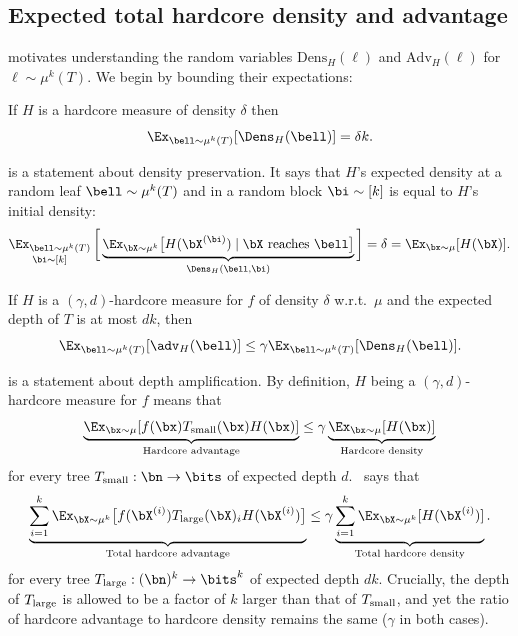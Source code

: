 \subsection{Expected total hardcore density and advantage}


 motivates understanding the random variables $\mathrm{Dens}_H(\boldsymbol{\ell})$ and $\mathrm{Adv}_H(\boldsymbol{\ell})$ for $\boldsymbol{\ell}\sim \mu^k(T)$. We begin by bounding their expectations:


\begin{claim}
\label{claim:expected total hardcore density} If $H$ is a hardcore measure of density $\delta$ then 
\[  \Ex_{\bell\sim \mu^k(T)}[\Dens_H(\bell)] = \delta k. \] 
\end{claim}


 is a statement about density preservation. It says that $H$'s expected density at a random leaf $\bell \sim \mu^k(T)$ and in a random block $\bi\sim [k]$ is equal to $H$'s initial density: 
\[  \mathop{\Ex_{\bell\sim \mu^k(T)}}_{\bi\sim [k]}\bigg[  \underbrace{\Ex_{\bX\sim \mu^k}\big[H(\bX^{(\bi)})\mid \text{$\bX$ reaches $\bell$}\big]}_{\Dens_H(\bell,\bi)}\bigg] = \delta = \Ex_{\bx\sim \mu}[H(\bX)]. \]
 

\begin{claim}
\label{claim:expected total hardcore advantage}
    If $H$ is a $(\gamma, d)$-hardcore measure for $f$ of density $\delta$ w.r.t.~$\mu$ and the expected depth of $T$ is at most $dk$, then 
    \begin{equation*}
        \Ex_{\bell \sim \mu^k(T)}[\adv_H(\bell)] \leq \gamma \Ex_{\bell\sim\mu^k(T)}[\Dens_H(\bell)]. 
    \end{equation*}
\end{claim}


 is a statement about depth amplification. By definition, $H$ being a $(\gamma,d)$-hardcore measure for $f$ means that 
    \begin{equation*}
        \underbrace{ \Ex_{\bx \sim \mu}[ f(\bx) T_{\textnormal{small}}(\bx) H(\bx)]}_{\textnormal{Hardcore advantage}}  \leq \gamma  \underbrace{\Ex_{\bx \sim \mu}[H(\bx)]}_{\textnormal{Hardcore density}}
    \end{equation*}
    for every tree $T_{\mathrm{small}} : \bn\to\bits$ of expected depth $d$.~ says that 
\[ \underbrace{\sum_{i=1}^k \Ex_{\bX\sim \mu^k}\big[ f(\bX^{(i)})T_{\textnormal{large}}(\bX)_i H(\bX^{(i)})\big] }_{\textnormal{Total hardcore advantage}} \le  \gamma   \underbrace{\sum_{i=1}^k \Ex_{\bX\sim\mu^k}[H(\bX^{(i)})]}_{ \textnormal{Total hardcore density}}. \]
for every tree $T_{\textnormal{large}} : (\bn)^k \to \bits^k$ of expected depth $dk$. Crucially, the depth of $T_{\textnormal{large}}$ is allowed to be a factor of $k$ larger than that of $T_{\textnormal{small}}$, and yet the ratio of hardcore advantage to hardcore density remains the same ($\gamma$ in both cases).  



